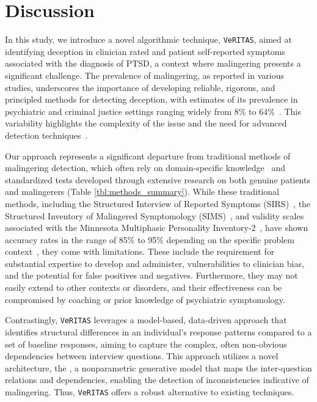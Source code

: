 \documentclass[onecolumn,10pt]{IEEEtran}
\def\vrts{\texttt{VeRITAS}\xspace}
\begin{document}
\section*{Discussion}
In this study, we introduce a novel algorithmic technique, \vrts, aimed at identifying deception in clinician rated and patient self-reported symptoms associated with the diagnosis of PTSD, a context where malingering presents a significant challenge. The prevalence of malingering, as reported in various studies, underscores the importance of developing reliable, rigorous, and principled methods for detecting deception, with estimates of its prevalence in psychiatric and criminal justice settings ranging widely from 8\% to 64\%~\cite{mcdermott2013malingering,schmidt2020base,matto2019systematic}. This variability highlights the complexity of the issue and the need for advanced detection techniques~\cite{DePaulo2003}.


Our approach represents a significant departure from traditional methods of malingering detection, which often rely on domain-specific knowledge~\cite{walczyk2018review} and standardized tests developed through extensive research on both genuine patients and malingerers (Table \ref{tbl:methods_summary}). While these traditional methods, including the Structured Interview of Reported Symptoms (SIRS)~\cite{Wong2005}, the Structured Inventory of Malingered Symptomology (SIMS)~\cite{smith1997detection}, and validity scales associated with the Minnesota Multiphasic Personality Inventory-2~\cite{ben2012interpreting}, have shown accuracy rates in the range of 85\% to 95\% depending on the specific problem context~\cite{rogers2008determinations,sartori2008accurately,gregg2007vying,monaro2017detection}, they come with limitations. These include the requirement for substantial expertise to develop and administer, vulnerabilities to clinician bias, and the potential for false positives and negatives. Furthermore, they may not easily extend to other contexts or disorders, and their effectiveness can be compromised by coaching or prior knowledge of psychiatric symptomology.

Contrastingly, \vrts leverages a model-based, data-driven approach that identifies structural differences in an individual's response patterns compared to a set of baseline responses, aiming to capture the complex, often non-obvious dependencies between interview questions. This approach utilizes a novel architecture, the \qnet, a nonparametric generative model that maps the inter-question relations and dependencies, enabling the detection of inconsistencies indicative of malingering. Thus, \vrts offers a robust alternative to existing techniques.
\end{document}
